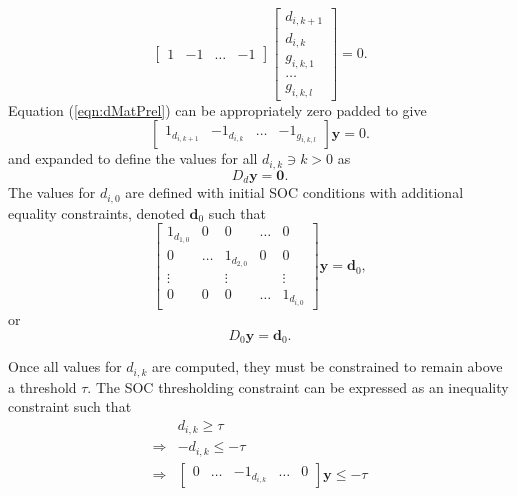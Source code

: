 \begin{equation}\label{eqn:dMatPrel}
	\begin{bmatrix}
		1 & -1 & \hdots & -1
	\end{bmatrix}
	\begin{bmatrix}
		d_{i,k+1} \\ d_{i,k} \\ g_{i,k,1} \\ \hdots \\ g_{i,k,l}
	\end{bmatrix} = 0.
\end{equation}
Equation (\ref{eqn:dMatPrel}) can be appropriately zero padded to give
\begin{equation}
	\begin{bmatrix}
		1_{d_{i,k+1}} & -1_{d_{i,k}} & \hdots & -1_{g_{i,k,l}}
	\end{bmatrix}
	\mathbf{y} = 0.  
\end{equation}
and expanded to define the values for all $d_{i,k} \ni k > 0$ as
\begin{equation}
	D_d\mathbf{y} = \mathbf{0}.
\end{equation}
The values for $d_{i,0}$ are defined with initial SOC conditions with additional equality constraints, denoted $\mathbf{d}_0$ such that
\begin{equation}
	\begin{bmatrix}
		1_{d_{1,0}}& 0 & 0 & \hdots & 0 \\
		0 & \hdots & 1_{d_{2,0}} & 0 & 0 \\
		\vdots  &        &    \vdots   &   & \vdots  \\
		0 & 0      & 0           & \hdots & 1_{d_{i,0}}
	\end{bmatrix}
	\mathbf{y} = \mathbf{d}_0,
\end{equation}
or 
\begin{equation}\label{eqn:dInitialFinal}
	D_0\mathbf{y} = \mathbf{d}_0.
\end{equation}
\par Once all values for $d_{i,k}$ are computed, they must be constrained to remain above a threshold $\tau$. The SOC thresholding constraint can be expressed as an inequality constraint such that
\begin{equation}\label{eqn:tau}
	\begin{aligned}
		& d_{i,k} \ge \tau \\
		\Rightarrow & -d_{i,k} \le -\tau \\
		\Rightarrow & \begin{bmatrix}0 & \hdots & -1_{d_{i,k}}& \hdots & 0 \end{bmatrix}\mathbf{y} \le -\tau
	\end{aligned}
\end{equation}
